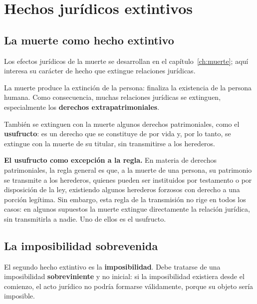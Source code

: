 \documentclass[12pt,oneside]{book}
\begin{document}
\chapter[Hechos jurídicos extintivos]{Hechos jurídicos extintivos}

\section{La muerte como hecho extintivo}

Los efectos jurídicos de la muerte se desarrollan en el capítulo~\ref{ch:muerte}; aquí interesa su carácter de hecho que extingue relaciones jurídicas.


La muerte produce la extinción de la persona: finaliza la existencia de la persona humana. Como consecuencia, muchas relaciones jurídicas se extinguen, especialmente los \textbf{derechos extrapatrimoniales}.

También se extinguen con la muerte algunos derechos patrimoniales, como el \textbf{usufructo}: es un derecho que se constituye de por vida y, por lo tanto, se extingue con la muerte de su titular, sin transmitirse a los herederos.

\begin{important}
\textbf{El usufructo como excepción a la regla.} En materia de derechos patrimoniales, la regla general es que, a la muerte de una persona, su patrimonio se transmite a los herederos, quienes pueden ser instituidos por testamento o por disposición de la ley, existiendo algunos herederos forzosos con derecho a una porción legítima. Sin embargo, esta regla de la transmisión no rige en todos los casos: en algunos supuestos la muerte extingue directamente la relación jurídica, sin transmitirla a nadie. Uno de ellos es el usufructo.
\end{important}

\section{La imposibilidad sobrevenida}

El segundo hecho extintivo es la \textbf{imposibilidad}. Debe tratarse de una imposibilidad \textbf{sobreviniente} y no inicial: si la imposibilidad existiera desde el comienzo, el acto jurídico no podría formarse válidamente, porque su objeto sería imposible.
\end{document}

